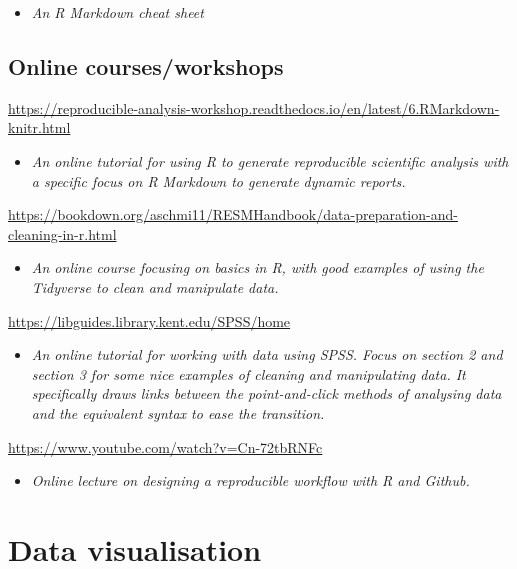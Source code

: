\documentclass[
]{book}
\providecommand{\tightlist}{%
  \setlength{\itemsep}{0pt}\setlength{\parskip}{0pt}}
\begin{document}
\begin{itemize}
\tightlist
\item
  \emph{An R Markdown cheat sheet}
\end{itemize}

\hypertarget{online-coursesworkshops}{%
\section{Online courses/workshops}\label{online-coursesworkshops}}

\url{https://reproducible-analysis-workshop.readthedocs.io/en/latest/6.RMarkdown-knitr.html}

\begin{itemize}
\tightlist
\item
  \emph{An online tutorial for using R to generate reproducible scientific analysis with a specific focus on R Markdown to generate dynamic reports.}
\end{itemize}

\url{https://bookdown.org/aschmi11/RESMHandbook/data-preparation-and-cleaning-in-r.html}

\begin{itemize}
\tightlist
\item
  \emph{An online course focusing on basics in R, with good examples of using the Tidyverse to clean and manipulate data.}
\end{itemize}

\url{https://libguides.library.kent.edu/SPSS/home}

\begin{itemize}
\tightlist
\item
  \emph{An online tutorial for working with data using SPSS. Focus on section 2 and section 3 for some nice examples of cleaning and manipulating data. It specifically draws links between the point-and-click methods of analysing data and the equivalent syntax to ease the transition.}
\end{itemize}

\url{https://www.youtube.com/watch?v=Cn-72tbRNFc}

\begin{itemize}
\tightlist
\item
  \emph{Online lecture on designing a reproducible workflow with R and Github.}
\end{itemize}

\hypertarget{data-visualisation}{%
\chapter{Data visualisation}\label{data-visualisation}}
\end{document}
